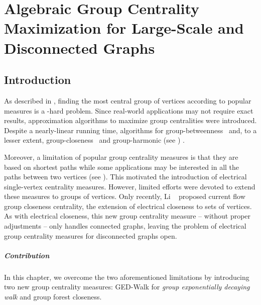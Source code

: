 \chapter{Algebraic Group Centrality Maximization for Large-Scale and
Disconnected Graphs}
\label{ch:ged-walk}

\section{Introduction}
%
As described in ,
finding the most central group of vertices according to popular measures is a
\np-hard problem. Since real-world applications may not require exact results,
approximation algorithms to maximize group centralities were introduced.
Despite a nearly-linear running time, algorithms for
group-betweenness~\cite{DBLP:conf/kdd/MahmoodyTU16,DBLP:conf/kdd/Yoshida14}
and, to a lesser extent, group-closeness~\cite{DBLP:conf/alenex/BergaminiGM18} and
group-harmonic (see )
.

Moreover, a limitation of popular group centrality measures is that they are
based on shortest paths while some applications may be interested in all the
paths between two vertices (see ).
This motivated the introduction of electrical single-vertex centrality measures.
However, limited efforts were devoted to extend these measures to groups
of vertices. Only recently, Li \etal~\cite{DBLP:conf/www/0002PSYZ19}
proposed current flow group closeness centrality, \ie the extension
of electrical closeness to sets of vertices. As with electrical closeness,
this new group centrality measure -- without proper adjustments -- only
handles connected graphs, leaving the problem of electrical group centrality measures
for disconnected graphs open.

\paragraph{Contribution} In this chapter, we overcome the two aforementioned
limitations by introducing two new group centrality
measures: GED-Walk for \emph{group exponentially decaying walk} and group
forest closeness.

